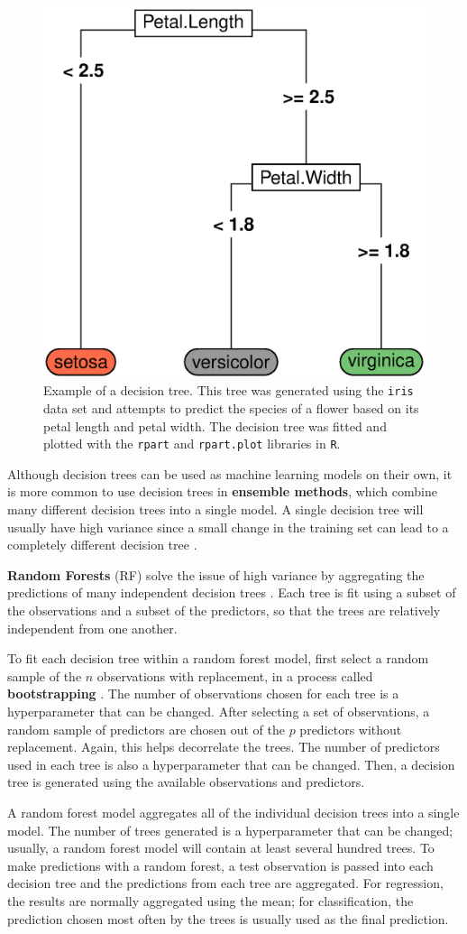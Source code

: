 \documentclass{article}
\begin{document}
\begin{figure}[h!]
	\centering
	\includegraphics[width = 0.4\linewidth]{images/decision-tree.eps}
	\captionsetup{width = 4in}
	\caption{Example of a decision tree. This tree was generated using the \lstinline!iris! data set and attempts to predict the species of a flower based on its petal length and petal width. The decision tree was fitted and plotted with the \lstinline!rpart! and \lstinline!rpart.plot! libraries in \lstinline!R!.}
	\label{fig:decision-tree}
\end{figure}

Although decision trees can be used as machine learning models on their own, it is more common to use decision trees in \textbf{ensemble methods}, which combine many different decision trees into a single model. A single decision tree will usually have high variance since a small change in the training set can lead to a completely different decision tree \cite{james2013introduction}.

\textbf{Random Forests} (RF) solve the issue of high variance by aggregating the predictions of many independent decision trees \cite{breiman2001random}. Each tree is fit using a subset of the observations and a subset of the predictors, so that the trees are relatively independent from one another.

To fit each decision tree within a random forest model, first select a random sample of the $n$ observations with replacement, in a process called \textbf{bootstrapping} \cite{efron1994introduction}. The number of observations chosen for each tree is a hyperparameter that can be changed. After selecting a set of observations, a random sample of predictors are chosen out of the $p$ predictors without replacement. Again, this helps decorrelate the trees. The number of predictors used in each tree is also a hyperparameter that can be changed. Then, a decision tree is generated using the available observations and predictors.

A random forest model aggregates all of the individual decision trees into a single model. The number of trees generated is a hyperparameter that can be changed; usually, a random forest model will contain at least several hundred trees. To make predictions with a random forest, a test observation is passed into each decision tree and the predictions from each tree are aggregated. For regression, the results are normally aggregated using the mean; for classification, the prediction chosen most often by the trees is usually used as the final prediction. 
\end{document}
